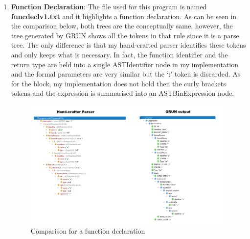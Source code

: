 \documentclass{article}
\begin{document}
\begin{enumerate}
					\item \textbf{Function Declaration}: The file used for this program is named \textbf{funcdeclv1.txt} and it highlights a function declaration. As can be seen in the comparison below, both trees are the conceptually same, however, the tree generated by GRUN shows all the tokens in that rule since it is a parse tree. The only difference is that my hand-crafted parser identifies these tokens and only keeps what is necessary.  In fact, the function identifier and the return type are held into a single ASTIdentifier node in my implementation and the formal parameters are very similar but the `:' token is discarded. As for the block, my implementation does not hold then the curly brackets tokens and the expression is summarised into an ASTBinExpression node.
						\begin{figure}[H]
					\centering
			 			\includegraphics[width=\textwidth]{comparefuncdecl.png}
			  			\caption{Comparison for a function declaration}
			  			\label{fig:comparefuncdecl}
					\end{figure}
					


\end{enumerate}
\end{document}
